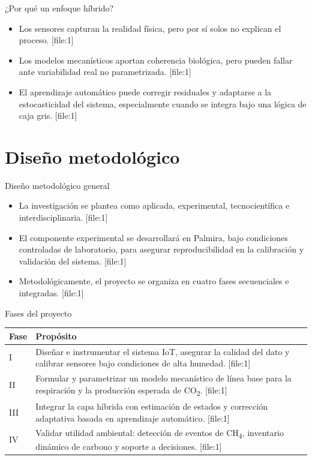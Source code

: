\documentclass[10pt,aspectratio=169]{beamer}
\newcommand{\basecite}{\hfill{\color{griscita}\tiny [file:1]}}
\begin{document}
\begin{frame}{¿Por qué un enfoque híbrido?}
\justifying
\begin{itemize}
    \item Los sensores capturan la realidad física, pero por sí solos no explican el proceso. \basecite
    \item Los modelos mecanísticos aportan coherencia biológica, pero pueden fallar ante variabilidad real no parametrizada. \basecite
    \item El aprendizaje automático puede corregir residuales y adaptarse a la estocasticidad del sistema, especialmente cuando se integra bajo una lógica de caja gris. \basecite
\end{itemize}
\end{frame}

\section{Diseño metodológico}

\begin{frame}{Diseño metodológico general}
\justifying
\begin{itemize}
    \item La investigación se plantea como aplicada, experimental, tecnocientífica e interdisciplinaria. \basecite
    \item El componente experimental se desarrollará en Palmira, bajo condiciones controladas de laboratorio, para asegurar reproducibilidad en la calibración y validación del sistema. \basecite
    \item Metodológicamente, el proyecto se organiza en cuatro fases secuenciales e integradas. \basecite
\end{itemize}
\end{frame}

\begin{frame}{Fases del proyecto}
\small
\begin{tabular}{p{} p{}}
\toprule
\textbf{Fase} & \textbf{Propósito} \\
\midrule
I & Diseñar e instrumentar el sistema IoT, asegurar la calidad del dato y calibrar sensores bajo condiciones de alta humedad. \basecite \\
II & Formular y parametrizar un modelo mecanístico de línea base para la respiración y la producción esperada de CO\textsubscript{2}. \basecite \\
III & Integrar la capa híbrida con estimación de estados y corrección adaptativa basada en aprendizaje automático. \basecite \\
IV & Validar utilidad ambiental: detección de eventos de CH\textsubscript{4}, inventario dinámico de carbono y soporte a decisiones. \basecite \\
\bottomrule
\end{tabular}
\end{frame}
\end{document}
